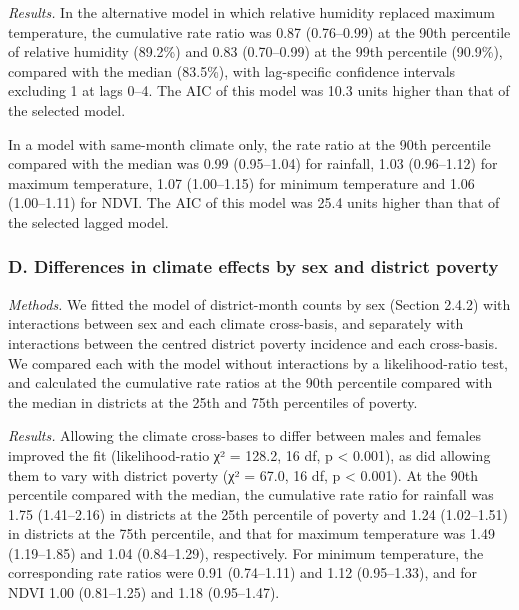 \documentclass[11pt,a4paper]{article}
\begin{document}
\emph{Results.} In the alternative model in which relative humidity replaced maximum temperature, the cumulative rate ratio was 0.87 (0.76--0.99) at the 90th percentile of relative humidity (89.2\%) and 0.83 (0.70--0.99) at the 99th percentile (90.9\%), compared with the median (83.5\%), with lag-specific confidence intervals excluding 1 at lags 0--4. The AIC of this model was 10.3 units higher than that of the selected model.

In a model with same-month climate only, the rate ratio at the 90th percentile compared with the median was 0.99 (0.95--1.04) for rainfall, 1.03 (0.96--1.12) for maximum temperature, 1.07 (1.00--1.15) for minimum temperature and 1.06 (1.00--1.11) for NDVI. The AIC of this model was 25.4 units higher than that of the selected lagged model.

\label{s1text-d}

\subsubsection*{D. Differences in climate effects by sex and district poverty}

\emph{Methods.} We fitted the model of district-month counts by sex (Section 2.4.2) with interactions between sex and each climate cross-basis, and separately with interactions between the centred district poverty incidence and each cross-basis. We compared each with the model without interactions by a likelihood-ratio test, and calculated the cumulative rate ratios at the 90th percentile compared with the median in districts at the 25th and 75th percentiles of poverty.

\emph{Results.} Allowing the climate cross-bases to differ between males and females improved the fit (likelihood-ratio χ² = 128.2, 16 df, p \textless{} 0.001), as did allowing them to vary with district poverty (χ² = 67.0, 16 df, p \textless{} 0.001). At the 90th percentile compared with the median, the cumulative rate ratio for rainfall was 1.75 (1.41--2.16) in districts at the 25th percentile of poverty and 1.24 (1.02--1.51) in districts at the 75th percentile, and that for maximum temperature was 1.49 (1.19--1.85) and 1.04 (0.84--1.29), respectively. For minimum temperature, the corresponding rate ratios were 0.91 (0.74--1.11) and 1.12 (0.95--1.33), and for NDVI 1.00 (0.81--1.25) and 1.18 (0.95--1.47).

\label{s1text-e}
\end{document}
